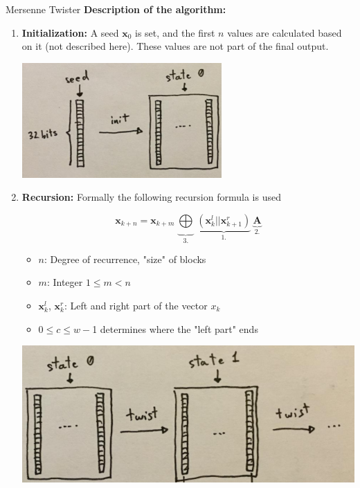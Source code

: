 \documentclass[11pt,compress,t,notes=noshow, xcolor=table]{beamer}
\begin{document}
\begin{vbframe}{Mersenne Twister}
\textbf{Description of the algorithm:}
\begin{enumerate}
\item \textbf{Initialization: } A seed $\mathbf{x}_0$ is set, and the first $n$ values are calculated based on it (not described here). These values are not part of the final output.
\vspace*{0.2cm}
\begin{center}
\includegraphics[width = 0.6\textwidth]{figure_man/mersenneinit.png}
\end{center}

\framebreak

\item \textbf{Recursion:} Formally the following recursion formula is used

$$
\mathbf{x}_{k + n} = \mathbf{x}_{k + m}\ \underbrace{\bigoplus}_{3.}\ \underbrace{(\mathbf{x}_{k}^l ||  \mathbf{x}_{k + 1}^r)}_{1.}\ \underbrace{\mathbf{A}}_{2.}
$$

\begin{itemize}
	\item $n$: Degree of recurrence, "size" of blocks
	\item $m$: Integer $1 \le m < n$
	\item $\mathbf{x}_{k}^l$, $\mathbf{x}_{k}^r$: Left and right part of the vector $x_{k}$
	\item $0 \le c \le w - $1 determines where the "left part" ends
\end{itemize}

\vspace*{0.2cm}

\begin{center}
	\includegraphics[width = 0.5 \textwidth]{figure_man/twist.png}
\end{center}


\end{enumerate}
\end{vbframe}
\end{document}
